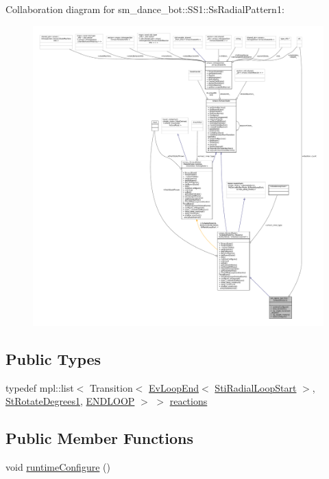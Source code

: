 Collaboration diagram for sm\+\_\+dance\+\_\+bot\+:\+:S\+S1\+:\+:Ss\+Radial\+Pattern1\+:
\nopagebreak
\begin{figure}[H]
\begin{center}
\leavevmode
\includegraphics[width=350pt]{structsm__dance__bot_1_1SS1_1_1SsRadialPattern1__coll__graph}
\end{center}
\end{figure}
\subsection*{Public Types}
\begin{DoxyCompactItemize}
\item 
typedef mpl\+::list$<$ Transition$<$ \hyperlink{structsmacc_1_1default__events_1_1EvLoopEnd}{Ev\+Loop\+End}$<$ \hyperlink{structsm__dance__bot_1_1radial__motion__states_1_1StiRadialLoopStart}{Sti\+Radial\+Loop\+Start} $>$, \hyperlink{structsm__dance__bot_1_1StRotateDegrees1}{St\+Rotate\+Degrees1}, \hyperlink{structsmacc_1_1default__transition__tags_1_1ENDLOOP}{E\+N\+D\+L\+O\+OP} $>$ $>$ \hyperlink{structsm__dance__bot_1_1SS1_1_1SsRadialPattern1_a771bd101df407fefe77cd6932405c94a}{reactions}
\end{DoxyCompactItemize}
\subsection*{Public Member Functions}
\begin{DoxyCompactItemize}
\item 
void \hyperlink{structsm__dance__bot_1_1SS1_1_1SsRadialPattern1_a97176fd198e7bdcde482183826bec968}{runtime\+Configure} ()
\end{DoxyCompactItemize}
